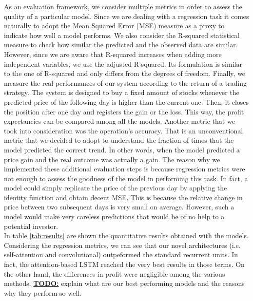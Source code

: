 \documentclass{article}
\begin{document}
As an evaluation framework, we consider multiple metrics in order to assess the quality
of a particular model. Since we are dealing with a regression task it comes naturally
to adopt the Mean Squared Error (MSE) measure as a proxy to indicate how well a model
performs. We also consider the R-squared statistical measure to check how similar
the predicted and the observed data are similar. However, since we are aware
that R-squared increases when adding more independent variables, we use the
adjusted R-squared. Its formulation is similar to the one of R-squared and only
differs from the degrees of freedom. Finally, we measure the real performances
of our system according to the return of a trading strategy. The system is
designed to buy a fixed amount of stocks whenever the predicted price of
the following day is higher than the current one. Then, it closes the position after one
day and registers the gain or the loss. This way, the profit expectancies can be compared
among all the models. Another metric that we took into consideration was the operation's
accuracy. That is an unconventional metric that we decided to adopt to understand the
fraction of times that the model predicted the correct trend. In other words, when the model
predicted a price gain and the real outcome was actually a gain. The reason why we
implemented these additional evaluation steps is because regression metrics were not enough
to assess the goodness of the model in performing this task. In fact, a model could
simply replicate the price of the previous day by applying the identity function and obtain
decent MSE. This is because the relative change in price between two subsequent days is
very small on average. However, such a model would make very careless predictions that
would be of no help to a potential investor. \\
In table \ref{tab:results} are shown the quantitative results obtained with the models.
Considering the regression metrics, we can see that our novel architectures (i.e. self-attention
and convolutional) outpeformed the standard recurrent units. In fact, the attention-based
LSTM reached the very best results in those terms. On the other hand, the differences in
profit were negligible among the various methods.
\underline{\textbf{TODO:}} explain what are our best performing models and the reasons why they perform so well.
\end{document}
